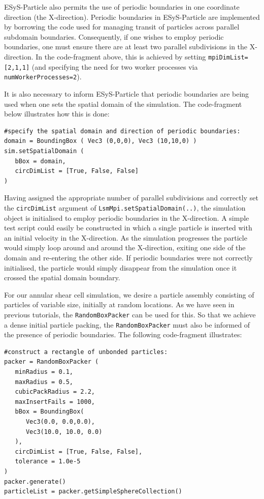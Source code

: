 ESyS-Particle also permits the use of periodic boundaries in one coordinate direction (the X-direction). Periodic boundaries in ESyS-Particle are implemented by borrowing the code used for managing transit of particles across parallel subdomain boundaries. Consequently, if one wishes to employ periodic boundaries, one must ensure there are at least two parallel subdivisions in the X-direction. In the code-fragment above, this is achieved by setting \texttt{mpiDimList=[2,1,1]} (and specifying the need for two worker processes via \texttt{numWorkerProcesses=2}). 

It is also necessary to inform ESyS-Particle that periodic boundaries are being used when one sets the spatial domain of the simulation. The code-fragment below illustrates how this is done:

\begin{verbatim}
#specify the spatial domain and direction of periodic boundaries:
domain = BoundingBox ( Vec3 (0,0,0), Vec3 (10,10,0) )
sim.setSpatialDomain (
   bBox = domain,
   circDimList = [True, False, False]
)
\end{verbatim}

Having assigned the appropriate number of parallel subdivisions and correctly set the \texttt{circDimList} argument of \texttt{LsmMpi.setSpatialDomain(..)}, the simulation object is initialised to employ periodic boundaries in the X-direction. A simple test script could easily be constructed in which a single particle is inserted with an initial velocity in the X-direction. As the simulation progresses the particle would simply loop around and around the X-direction, exiting one side of the domain and re-entering the other side. If periodic boundaries were not correctly initialised, the particle would simply disappear from the simulation once it crossed the spatial domain boundary.

For our annular shear cell simulation, we desire a particle assembly consisting of particles of variable size, initially at random locations. As we have seen in previous tutorials, the \texttt{RandomBoxPacker} can be used for this. So that we achieve a dense initial particle packing, the \texttt{RandomBoxPacker} must also be informed of the presence of periodic boundaries. The following code-fragment illustrates:

\begin{verbatim}
#construct a rectangle of unbonded particles:
packer = RandomBoxPacker (
   minRadius = 0.1,
   maxRadius = 0.5,
   cubicPackRadius = 2.2,
   maxInsertFails = 1000,
   bBox = BoundingBox(
      Vec3(0.0, 0.0,0.0),
      Vec3(10.0, 10.0, 0.0)
   ),
   circDimList = [True, False, False],
   tolerance = 1.0e-5
)
packer.generate()
particleList = packer.getSimpleSphereCollection()
\end{verbatim}

